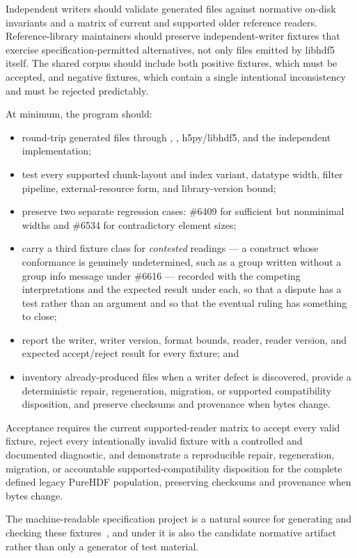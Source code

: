 \documentclass[../main.tex]{subfiles}
\begin{document}
Independent writers should validate generated files against normative on-disk
invariants and a matrix of current and supported older reference readers.
Reference-library maintainers should preserve independent-writer fixtures that
exercise specification-permitted alternatives, not only files emitted by
libhdf5 itself. The shared corpus should include both positive fixtures, which
must be accepted, and negative fixtures, which contain a single intentional
inconsistency and must be rejected predictably.

At minimum, the program should:

\begin{itemize}
    \item round-trip generated files through , ,
          h5py/libhdf5, and the independent implementation;
    \item test every supported chunk-layout and index variant, datatype width,
          filter pipeline, external-resource form, and library-version bound;
    \item preserve two separate regression cases: \#6409 for sufficient but
          nonminimal widths and \#6534 for contradictory element sizes;
    \item carry a third fixture class for \emph{contested} readings --- a
          construct whose conformance is genuinely undetermined, such as a
          group written without a group info message under \#6616 --- recorded
          with the competing interpretations and the expected result under
          each, so that a dispute has a test rather than an argument and so
          that the eventual ruling has something to close;
    \item report the writer, writer version, format bounds, reader, reader
          version, and expected accept/reject result for every fixture; and
    \item inventory already-produced files when a writer defect is discovered,
          provide a deterministic repair, regeneration, migration, or supported
          compatibility disposition, and preserve checksums and provenance when
          bytes change.
\end{itemize}

Acceptance requires the current supported-reader matrix to accept every valid
fixture, reject every intentionally invalid fixture with a controlled and
documented diagnostic, and demonstrate a reproducible repair, regeneration,
migration, or accountable supported-compatibility disposition for the complete
defined legacy PureHDF population, preserving checksums and provenance when
bytes change.

The machine-readable specification project  is a natural
source for generating and checking these fixtures~\cite{h5lens}, and
under  it is also the candidate normative artifact rather than
only a generator of test material.
\fi
\end{document}
